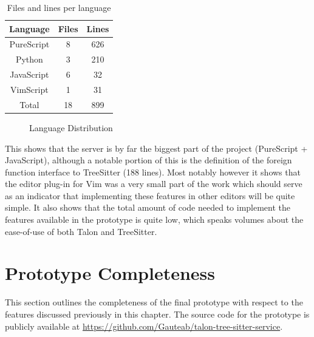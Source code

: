 \documentclass[../thesis.tex]{subfiles}
\begin{document}
\begin{table}[htpb]
    \centering
    \begin{tabular}{|c|c|c|}
        \hline
        Language&Files&Lines\\
        \hline
        PureScript&8&626\\
        Python&3&210\\
        JavaScript&6&32\\
        VimScript&1&31\\
        \hline
        Total&18&899\\
        \hline
    \end{tabular}
    \caption{Files and lines per language}
    \label{tab:stats}
\end{table}


\begin{figure}[htpb]
    \centering
    
    \caption{Language Distribution}%
    \label{fig:lang_dist}
\end{figure}

This shows that the server is by far the biggest part of the project (PureScript + JavaScript),
although a notable portion of this is the definition of the foreign function interface to TreeSitter (188 lines).
Most notably however it shows that the editor plug-in for Vim was a very small part of the work
which should serve as an indicator that implementing these features in other editors will be quite simple.
It also shows that the total amount of code needed to implement the features available in the prototype
is quite low, which speaks volumes about the ease-of-use of both Talon and TreeSitter.


\section{Prototype Completeness}%
\label{sec:prototype_completeness}
This section outlines the completeness of the final prototype with respect to
the features discussed previously in this chapter.
The source code for the prototype is publicly available at \url{https://github.com/Gauteab/talon-tree-sitter-service}.
\end{document}
